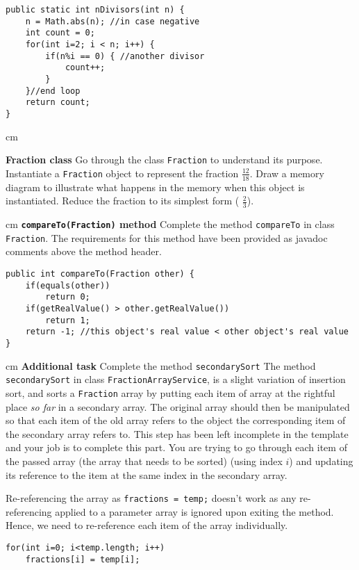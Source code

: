 \begin{questions}
\begin{solution}
\begin{lstlisting}[style=buggy]
public static int nDivisors(int n) {
	n = Math.abs(n); //in case negative
	int count = 0;
	for(int i=2; i < n; i++) {
		if(n%i == 0) { //another divisor
			count++;
		}
	}//end loop
	return count;
}	
\end{lstlisting}
\end{solution}

 cm

\question  \textbf{Fraction class} \vskip 0.5cm
Go through the class \texttt{Fraction} to understand its purpose. Instantiate a \texttt{Fraction} object to represent the fraction $\frac{12}{18}$. Draw a memory diagram to illustrate what happens in the memory when this object is instantiated. Reduce the fraction to its simplest form ( $\frac{2}{3}$).

 cm \question  \textbf{\texttt{compareTo(Fraction)} method} \vskip 0.5cm
Complete the method \texttt{compareTo} in class \texttt{Fraction}. The requirements for this method have been provided as javadoc comments above the method header. 

\begin{solution}
\begin{lstlisting}
public int compareTo(Fraction other) {
	if(equals(other))
		return 0;
	if(getRealValue() > other.getRealValue())
		return 1;
	return -1; //this object's real value < other object's real value
}
\end{lstlisting}
\end{solution}

 cm \question \textbf{Additional task }Complete the method \texttt{secondarySort} \vskip 0.5cm
The method \texttt{secondarySort} in class \texttt{FractionArrayService}, is a slight variation of insertion sort, and sorts a \texttt{Fraction} array by putting each item of array at the rightful place \emph{so far} in a secondary array. The original array should then be manipulated so that each item of the old array refers to the object the corresponding item of the secondary array refers to. This step has been left incomplete in the template and your job is to complete this part. You are trying to go through each item of the passed array (the array that needs to be sorted) (using index $i$) and updating its reference to the item at the same index in the secondary array.

\ifprintanswers
Re-referencing the array as \texttt{fractions = temp;} doesn't work as any re-referencing applied to a parameter array is ignored upon exiting the method. Hence, we need to re-reference each item of the array individually.
\begin{lstlisting}
for(int i=0; i<temp.length; i++)
	fractions[i] = temp[i];
\end{lstlisting}
\else
\newpage
\fi


\end{questions}
